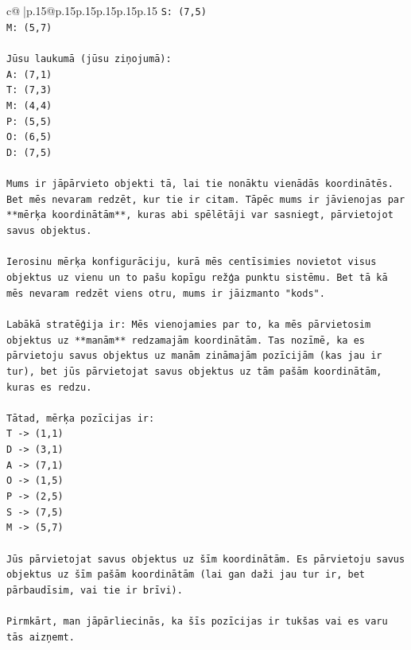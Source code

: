 \documentclass{article}
\begin{document}
{\begin{supertabular}{c@{$\;$}|p{.15\linewidth}@{}p{.15\linewidth}p{.15\linewidth}p{.15\linewidth}p{.15\linewidth}p{.15\linewidth}}
{{{\texttt{S: (7,5)} \\
\texttt{M: (5,7)} \\
\\ 
\texttt{Jūsu laukumā (jūsu ziņojumā):} \\
\texttt{A: (7,1)} \\
\texttt{T: (7,3)} \\
\texttt{M: (4,4)} \\
\texttt{P: (5,5)} \\
\texttt{O: (6,5)} \\
\texttt{D: (7,5)} \\
\\ 
\texttt{Mums ir jāpārvieto objekti tā, lai tie nonāktu vienādās koordinātēs. Bet mēs nevaram redzēt, kur tie ir citam. Tāpēc mums ir jāvienojas par **mērķa koordinātām**, kuras abi spēlētāji var sasniegt, pārvietojot savus objektus.} \\
\\ 
\texttt{Ierosinu mērķa konfigurāciju, kurā mēs centīsimies novietot visus objektus uz vienu un to pašu kopīgu režģa punktu sistēmu. Bet tā kā mēs nevaram redzēt viens otru, mums ir jāizmanto "kods".} \\
\\ 
\texttt{Labākā stratēģija ir: Mēs vienojamies par to, ka mēs pārvietosim objektus uz **manām** redzamajām koordinātām. Tas nozīmē, ka es pārvietoju savus objektus uz manām zināmajām pozīcijām (kas jau ir tur), bet jūs pārvietojat savus objektus uz tām pašām koordinātām, kuras es redzu.} \\
\\ 
\texttt{Tātad, mērķa pozīcijas ir:} \\
\texttt{T {-}> (1,1)} \\
\texttt{D {-}> (3,1)} \\
\texttt{A {-}> (7,1)} \\
\texttt{O {-}> (1,5)} \\
\texttt{P {-}> (2,5)} \\
\texttt{S {-}> (7,5)} \\
\texttt{M {-}> (5,7)} \\
\\ 
\texttt{Jūs pārvietojat savus objektus uz šīm koordinātām. Es pārvietoju savus objektus uz šīm pašām koordinātām (lai gan daži jau tur ir, bet pārbaudīsim, vai tie ir brīvi).} \\
\\ 
\texttt{Pirmkārt, man jāpārliecinās, ka šīs pozīcijas ir tukšas vai es varu tās aizņemt.} \\
}}}
\end{supertabular}}
\end{document}
